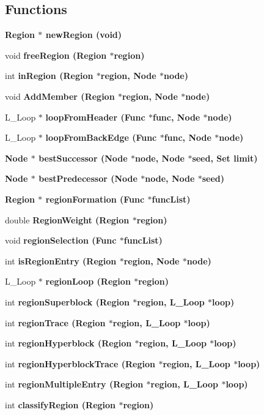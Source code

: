 \subsection*{Functions}
\begin{CompactItemize}
\item 
\bf{Region} $\ast$ \bf{new\-Region} (void)
\item 
void \bf{free\-Region} (\bf{Region} $\ast$\bf{region})
\item 
int \bf{in\-Region} (\bf{Region} $\ast$\bf{region}, \bf{Node} $\ast$\bf{node})
\item 
void \bf{Add\-Member} (\bf{Region} $\ast$\bf{region}, \bf{Node} $\ast$\bf{node})
\item 
L\_\-Loop $\ast$ \bf{loop\-From\-Header} (\bf{Func} $\ast$func, \bf{Node} $\ast$\bf{node})
\item 
L\_\-Loop $\ast$ \bf{loop\-From\-Back\-Edge} (\bf{Func} $\ast$func, \bf{Node} $\ast$\bf{node})
\item 
\bf{Node} $\ast$ \bf{best\-Successor} (\bf{Node} $\ast$\bf{node}, \bf{Node} $\ast$seed, \bf{Set} limit)
\item 
\bf{Node} $\ast$ \bf{best\-Predecessor} (\bf{Node} $\ast$\bf{node}, \bf{Node} $\ast$seed)
\item 
\bf{Region} $\ast$ \bf{region\-Formation} (\bf{Func} $\ast$func\-List)
\item 
double \bf{Region\-Weight} (\bf{Region} $\ast$\bf{region})
\item 
void \bf{region\-Selection} (\bf{Func} $\ast$func\-List)
\item 
int \bf{is\-Region\-Entry} (\bf{Region} $\ast$\bf{region}, \bf{Node} $\ast$\bf{node})
\item 
L\_\-Loop $\ast$ \bf{region\-Loop} (\bf{Region} $\ast$\bf{region})
\item 
int \bf{region\-Superblock} (\bf{Region} $\ast$\bf{region}, L\_\-Loop $\ast$loop)
\item 
int \bf{region\-Trace} (\bf{Region} $\ast$\bf{region}, L\_\-Loop $\ast$loop)
\item 
int \bf{region\-Hyperblock} (\bf{Region} $\ast$\bf{region}, L\_\-Loop $\ast$loop)
\item 
int \bf{region\-Hyperblock\-Trace} (\bf{Region} $\ast$\bf{region}, L\_\-Loop $\ast$loop)
\item 
int \bf{region\-Multiple\-Entry} (\bf{Region} $\ast$\bf{region}, L\_\-Loop $\ast$loop)
\item 
int \bf{classify\-Region} (\bf{Region} $\ast$\bf{region})
\item 

\end{CompactItemize}
